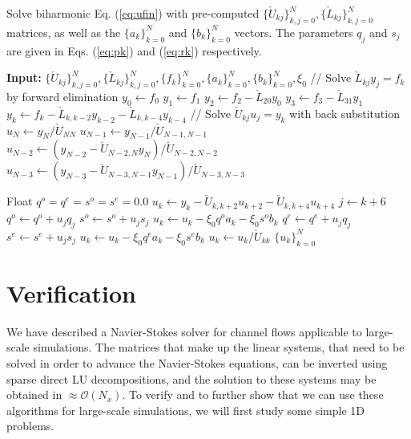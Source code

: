 \documentclass[11pt, oneside]{elsarticle}
\newcommand{\N}[1]{\check{#1}}
\begin{document}
\begin{algorithm}
	\caption{Solve biharmonic Eq. (\ref{eq:ufin}) with pre-computed $\{\N{U}_{kj}\}_{k,j=0}^{N}, 
		\{\N{L}_{kj}\}_{k,j=0}^{N}$ 
	matrices, as well as the $\{ a_k\}_{k=0}^N$ and $\{ b_k\}_{k=0}^N$ vectors. The parameters $q_j$ and $s_j$ are given in Eqs. (\ref{eq:pk}) and 
	(\ref{eq:rk}) respectively. 	\label{alg:SolveBiharmonic}}
	\begin{algorithmic}[1]
		  \State \textbf{Input:} $\{\N{U}_{kj}\}_{k,j=0}^{N}, 
		  \{\N{L}_{kj}\}_{k,j=0}^{N}, 
		  \{f_k\}_{k=0}^{N}, \{a_k\}_{k=0}^{N}, \{b_k\}_{k=0}^{N}, \xi_0$ 
		  \State // Solve $\N{L}_{kj}y_j=f_k$ by forward elimination 
		  \State $y_0 \gets f_0$
		  \State $y_1 \gets f_1$
		  \State $y_2 \gets f_2 - \N{L}_{20}y_{0}$
		  \State $y_3 \gets f_3 - \N{L}_{31}y_{1}$
		  \State $y_k \gets f_k - \N{L}_{k,k-2}y_{k-2} - \N{L}_{k, k-4}y_{k-4}$
		  \EndFor
		  \State // Solve $\N{U}_{kj}u_j=y_k$ with back 
		  substitution                    
		  \State $u_N \gets y_N / \N{U}_{NN}$
	      \State $u_{N-1} \gets y_{N-1} / \N{U}_{N-1,N-1}$
	      \State $u_{N-2} \gets \left(y_{N-2} - \N{U}_{N-2, 
	      N}y_N\right)/\N{U}_{N-2,N-2}$
	      \State $u_{N-3} \gets \left(y_{N-3} - \N{U}_{N-3, 
	      N-1}y_{N-1}\right)/\N{U}_{N-3,N-3}$
	      
	      \State Float $q^o = q^e = s^o = s^e = 0.0$
		  \State $u_k \gets y_k - \N{U}_{k, k+2} u_{k+2} - \N{U}_{k, k+4} 
		  u_{k+4} $ 
		  \State $j \gets k+6$
		    \State $q^o \gets q^o + u_{j}q_{j}$
		    \State $s^o \gets s^o + u_{j}s_{j}$
		    \State $u_k \gets u_k - \xi_0q^o a_k - \xi_0s^o b_k $	    
		  \Else
		    \State $q^e \gets q^e + u_{j}q_{j}$
		    \State $s^e \gets s^e + u_{j}s_{j}$	  
		    \State $u_k \gets u_k - \xi_0q^e a_k - \xi_0s^e b_k $
		  \EndIf
		  \EndIf
		  \State $u_k \gets  u_k / \N{U}_{kk}$
		  \EndFor
		  \State \Return $\{u_k\}_{k=0}^{N}$  
		  
		\EndProcedure
	\end{algorithmic}
\end{algorithm}

\section{Verification}
\label{sec:verification}
We have described a Navier-Stokes solver for channel flows applicable to large-scale simulations. The 
matrices that make up the linear systems, that need to be solved in order to advance the Navier-Stokes equations, can be inverted using sparse direct LU 
decompositions, and the solution to these systems may be obtained in $\approx \mathcal{O}(N_x)$. To verify and to further show that we 
can use these algorithms for large-scale simulations, we will first study some simple 1D problems. 
\end{document}
